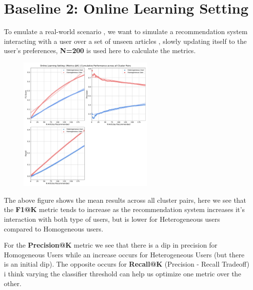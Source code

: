 \documentclass[a4paper,fontsize=9.0pt]{scrartcl}
\begin{document}
\vspace{-1ex}
\section{Baseline 2: Online Learning Setting}
\begin{flushleft}
To emulate a real-world scenario , we want to simulate a recommendation system interacting with a user over a set of unseen articles , slowly updating itself to the user's preferences, \textbf{N=200} is used here to calculate the metrics.
\end{flushleft}
\vspace{-3ex}
\begin{figure}[H]
 \includegraphics[width=0.6\textwidth]{Graphs/user_interaction_vs_model_performance_cumu.pdf}
\end{figure}
\begin{flushleft}
The above figure shows the mean results across all cluster pairs, here we see that the \textbf{F1@K} metric tends to increase as the recommendation system increases it's interaction with both type of users, but is lower for Heterogeneous users compared to Homogeneous users.
\end{flushleft}
\begin{flushleft}
For the \textbf{Precision@K} metric we see that there is a dip in precision for Homogeneous Users while an increase occurs for Heterogeneous Users (but there is an initial dip). The opposite occurs for \textbf{Recall@K} (Precision - Recall Tradeoff) i think varying  the classifier threshold can help us optimize one metric over the other.
\end{flushleft}


\vspace{-1ex}
\end{document}
